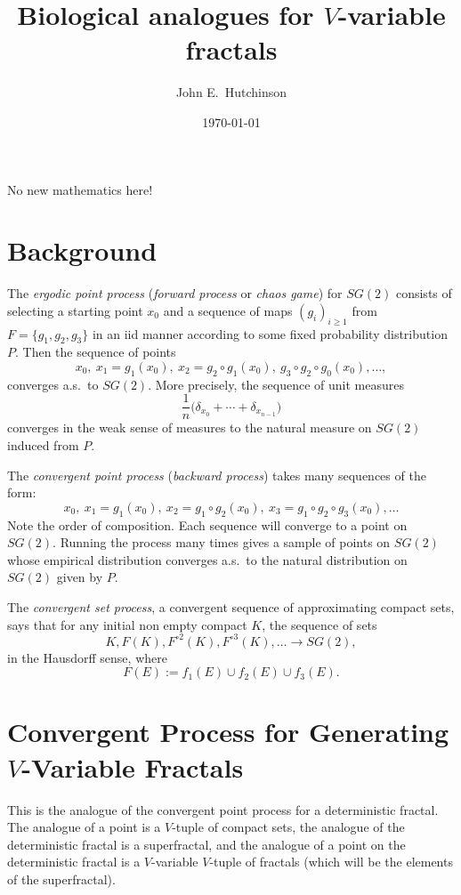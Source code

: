 \documentclass[a4paper]{amsart}
\begin{document}
 
 \title{Biological analogues for $ V $-variable fractals}  
\author{John E.\ Hutchinson}
\date{\today}
 
 
 \maketitle
 
 No new mathematics here!
 
\bigskip  

% 
% 


\section{Background}
The \emph{ergodic point process} (\emph{forward process} or \emph{chaos game}) for $ SG(2) $  consists of selecting a starting point $ x_0 $ and a sequence of maps $ (g_i)_{i\geq 1} $ from $ F=\{g_1,g_2,g_3  \} $ in an iid manner according to some fixed probability distribution $ P $.  Then the sequence of points
\[
x_0,\  x_1=g_1(x_0),\  x_2 = g_2\circ g_1(x_0), \  g_3\circ g_2 \circ g_0 (x_0),                   \dots ,
\]
converges a.s.\  to $  SG(2) $.       
More precisely, the sequence of unit measures
\[
\frac{1}{n} \big(\delta_{x_0}+\cdots + \delta_{x_{n-1}}\big)
\]
converges in the weak sense of measures to the natural measure on $ SG(2) $ induced from $ P $.

\bigskip
The \emph{convergent point process} (\emph{backward process}) takes many sequences of the form:
\[
x_0,  \  x_1 = g_1(x_0),\  x_2 = g_1\circ g_2(x_0),\  x_3 = g_1\circ g_2 \circ g_3 (x_0), \dots 
\]
Note the order of composition.  Each sequence will converge to a point on $ SG(2) $.  Running the process many times gives a sample of points on $ SG(2) $ whose empirical distribution converges a.s.\ to the natural distribution on $ SG(2) $ given by $ P $.


\bigskip
The \emph{convergent set process}, a convergent sequence of approximating compact sets, says that for any initial non empty compact $ K $, the sequence of sets
\[
K, F(K), F^{\circ 2}(K), F^{\circ 3}(K), \dots \to SG(2),\]
in the Hausdorff  sense, where 
\[ F(E) := f_1(E) \cup f_2(E) \cup f_3(E). \]






\newpage \section{Convergent Process for Generating $ V $-Variable Fractals} This is the analogue of the convergent point process for a deterministic fractal.   The analogue of a point is a $ V $-tuple of compact sets, the analogue of the deterministic fractal is a superfractal, and the analogue of a point on the deterministic fractal is a $ V $-variable $ V $-tuple of fractals (which will be the elements of the superfractal).
 
\end{document}
